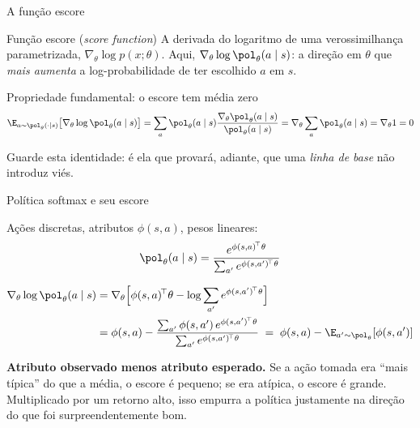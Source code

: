 \documentclass[aspectratio=169, 11pt]{beamer}
\newcommand{\thv}{\theta}                       %
\newcommand{\polth}{\pol_{\thv}}                %
\newcommand{\gth}{\nabla_{\thv}}                %
\newcommand{\feat}{\phi}                        %
\newcommand{\gscore}{\gth \log \polth(a \mid s)} %
\begin{document}
\begin{frame}{A função escore}

  \begin{defbox}{Função escore \textnormal{(\emph{score function})}}
    A derivada do logaritmo de uma verossimilhança parametrizada,
    $\gth \log p(x;\thv)$. Aqui, $\gscore$: a direção em $\thv$ que
    \emph{mais aumenta} a log-probabilidade de ter escolhido $a$ em $s$.
  \end{defbox}

  \begin{teobox}{Propriedade fundamental: o escore tem média zero}
    \vspace{-0.9em}
    \[
      \E_{a\sim\polth(\cdot\mid s)}\bigl[\gscore\bigr]
      = \sum_a \polth(a\mid s)\frac{\gth\polth(a\mid s)}{\polth(a\mid s)}
      = \gth \sum_a \polth(a\mid s) = \gth 1 = 0
    \]
    \vspace{-0.9em}

    Guarde esta identidade: é ela que provará, adiante, que uma
    \emph{linha de base} não introduz viés.
  \end{teobox}
\end{frame}

\begin{frame}{Política softmax e seu escore}

  Ações discretas, atributos $\feat(s,a)$, pesos lineares:
  \[
    \polth(a \mid s) = \frac{e^{\feat(s,a)^{\!\top}\thv}}
                            {\sum_{a'} e^{\feat(s,a')^{\!\top}\thv}}
  \]

  {\small
  \begin{align*}
    \gscore
      &= \gth\Bigl[\feat(s,a)^{\!\top}\thv - \log \sum_{a'} e^{\feat(s,a')^{\!\top}\thv}\Bigr] \\
      &= \feat(s,a) - \frac{\sum_{a'} \feat(s,a')\, e^{\feat(s,a')^{\!\top}\thv}}
                            {\sum_{a'} e^{\feat(s,a')^{\!\top}\thv}}
       \;=\; \feat(s,a) - \E_{a'\sim\polth}[\feat(s,a')]
  \end{align*}}

  \begin{ideiabox}
    \textbf{Atributo observado menos atributo esperado.} Se a ação tomada era
    ``mais típica'' do que a média, o escore é pequeno; se era atípica, o
    escore é grande. Multiplicado por um retorno alto, isso empurra a política
    justamente na direção do que foi surpreendentemente bom.
  \end{ideiabox}
\end{frame}
\end{document}
